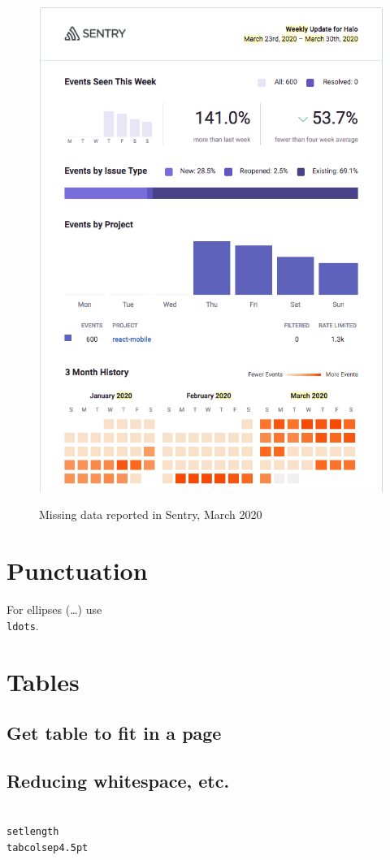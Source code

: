 \begin{figure}[htbp!]
\begin{minipage}{.45\textwidth}
  \includegraphics[width=\textwidth]{images/localhalo/sentry-weekly-report-23-mar-2020.png}
  \label{fig:localhalo-sentry-weekly-report-23-mar-2020}
\end{minipage}
    \caption{Missing data reported in Sentry, March 2020}
    \label{fig:sentry-missing-data-march-2020}
\end{figure}

\section{Punctuation}

For ellipses (\ldots) use \texttt{\\ldots}.

\section{Tables}

\subsection{Get table to fit in a page}

\subsection{Reducing whitespace, etc.}

\texttt{\\setlength\\tabcolsep{4.5pt}} %